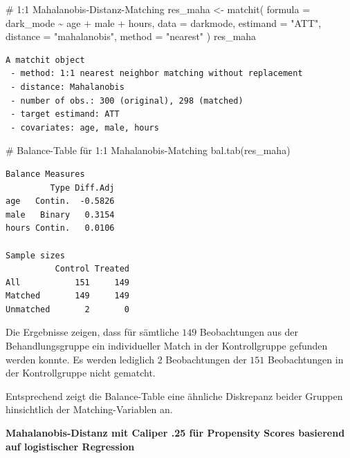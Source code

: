 \documentclass[
  a4paper,
  DIV=11,
  oneside]{scrreprt}
\newenvironment{Shaded}{\begin{snugshade}}{\end{snugshade}}
\newcommand{\AttributeTok}[1]{\textcolor[rgb]{0.40,0.45,0.13}{#1}}
\newcommand{\CommentTok}[1]{\textcolor[rgb]{0.37,0.37,0.37}{#1}}
\newcommand{\FunctionTok}[1]{\textcolor[rgb]{0.28,0.35,0.67}{#1}}
\newcommand{\NormalTok}[1]{\textcolor[rgb]{0.00,0.23,0.31}{#1}}
\newcommand{\OtherTok}[1]{\textcolor[rgb]{0.00,0.23,0.31}{#1}}
\newcommand{\SpecialCharTok}[1]{\textcolor[rgb]{0.37,0.37,0.37}{#1}}
\newcommand{\StringTok}[1]{\textcolor[rgb]{0.13,0.47,0.30}{#1}}
\begin{document}
\begin{Shaded}
\begin{Highlighting}[]
\CommentTok{\# 1:1 Mahalanobis{-}Distanz{-}Matching}
\NormalTok{res\_maha }\OtherTok{\textless{}{-}} \FunctionTok{matchit}\NormalTok{(}
  \AttributeTok{formula =}\NormalTok{ dark\_mode }\SpecialCharTok{\textasciitilde{}}\NormalTok{ age }\SpecialCharTok{+}\NormalTok{ male }\SpecialCharTok{+}\NormalTok{ hours, }
  \AttributeTok{data =}\NormalTok{ darkmode, }
  \AttributeTok{estimand =} \StringTok{"ATT"}\NormalTok{,}
  \AttributeTok{distance =} \StringTok{"mahalanobis"}\NormalTok{, }
  \AttributeTok{method =} \StringTok{"nearest"}
\NormalTok{)}
\NormalTok{res\_maha}
\end{Highlighting}
\end{Shaded}

\begin{verbatim}
A matchit object
 - method: 1:1 nearest neighbor matching without replacement
 - distance: Mahalanobis
 - number of obs.: 300 (original), 298 (matched)
 - target estimand: ATT
 - covariates: age, male, hours
\end{verbatim}

\begin{Shaded}
\begin{Highlighting}[]
\CommentTok{\# Balance{-}Table für 1:1 Mahalanobis{-}Matching}
\FunctionTok{bal.tab}\NormalTok{(res\_maha)}
\end{Highlighting}
\end{Shaded}

\begin{verbatim}
Balance Measures
         Type Diff.Adj
age   Contin.  -0.5826
male   Binary   0.3154
hours Contin.   0.0106

Sample sizes
          Control Treated
All           151     149
Matched       149     149
Unmatched       2       0
\end{verbatim}

Die Ergebnisse zeigen, dass für sämtliche \(149\) Beobachtungen aus der
Behandlungsgruppe ein individueller Match in der Kontrollgruppe gefunden
werden konnte. Es werden lediglich \(2\) Beobachtungen der \(151\)
Beobachtungen in der Kontrollgruppe nicht gematcht.

Entsprechend zeigt die Balance-Table eine ähnliche Diskrepanz beider
Gruppen hinsichtlich der Matching-Variablen an.

\textbf{Mahalanobis-Distanz mit Caliper .25 für Propensity Scores
basierend auf logistischer Regression}
\end{document}
